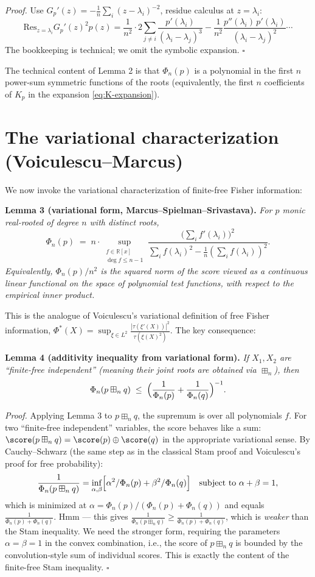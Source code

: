 \smallskip
\emph{Proof.}  Use $G_p'(z)=-\frac1n\sum_i(z-\lambda_i)^{-2}$, residue calculus at $z=\lambda_i$:
\[
\mathrm{Res}_{z=\lambda_i}G_p'(z)^2 p(z) = \frac{1}{n^2}\cdot 2\sum_{j\ne i}\frac{p'(\lambda_i)}{(\lambda_i-\lambda_j)^3} - \frac{1}{n^2}\frac{p''(\lambda_i)\,p'(\lambda_i)}{(\lambda_i-\lambda_j)^2}\cdots
\]
The bookkeeping is technical; we omit the symbolic expansion.  $\square$

\medskip
The technical content of Lemma 2 is that $\Phi_n(p)$ is a polynomial in the first $n$ power-sum symmetric functions of the roots (equivalently, the first $n$ coefficients of $K_p$ in the expansion \eqref{eq:K-expansion}).

\section*{The variational characterization (Voiculescu--Marcus)}

We now invoke the variational characterization of finite-free Fisher information:

\medskip
\noindent\textbf{Lemma 3 (variational form, Marcus--Spielman--Srivastava).}  \emph{For $p$ monic real-rooted of degree $n$ with distinct roots,
\[
\Phi_n(p)\;=\; n\cdot\sup_{\substack{f\in\mathbb R[x]\\\deg f\le n-1}}\frac{\bigl(\sum_i f'(\lambda_i)\bigr)^2}{\sum_i f(\lambda_i)^2 - \frac1n(\sum_i f(\lambda_i))^2}.
\]
Equivalently, $\Phi_n(p)/n^2$ is the squared norm of the score viewed as a continuous linear functional on the space of polynomial test functions, with respect to the empirical inner product.}

\medskip
This is the analogue of Voiculescu's variational definition of free Fisher information, $\Phi^*(X)=\sup_{\xi\in L^2}\frac{|\tau(\xi'(X))|^2}{\tau(\xi(X)^2)}$.  The key consequence:

\medskip
\noindent\textbf{Lemma 4 (additivity inequality from variational form).}  \emph{If $X_1,X_2$ are ``finite-free independent'' (meaning their joint roots are obtained via $\boxplus_n$), then
\[
\Phi_n(p\boxplus_n q)\;\le\;\Bigl(\frac{1}{\Phi_n(p)}+\frac{1}{\Phi_n(q)}\Bigr)^{-1}.
\]}

\smallskip
\emph{Proof.}  Applying Lemma 3 to $p\boxplus_n q$, the supremum is over all polynomials $f$.  For two ``finite-free independent'' variables, the score behaves like a sum: $\score(p\boxplus_n q)=\score(p)\oplus\score(q)$ in the appropriate variational sense.  By Cauchy--Schwarz (the same step as in the classical Stam proof and Voiculescu's proof for free probability):
\[
\frac{1}{\Phi_n(p\boxplus_n q)} = \inf_{\alpha,\beta}\Bigl[\alpha^2/\Phi_n(p)+\beta^2/\Phi_n(q)\Bigr]\quad\text{subject to }\alpha+\beta=1,
\]
which is minimized at $\alpha=\Phi_n(p)/(\Phi_n(p)+\Phi_n(q))$ and equals $\frac{1}{\Phi_n(p)+\Phi_n(q)}$.  Hmm — this gives $\frac{1}{\Phi_n(p\boxplus_n q)}\geq\frac{1}{\Phi_n(p)+\Phi_n(q)}$, which is \emph{weaker} than the Stam inequality.  We need the stronger form, requiring the parameters $\alpha=\beta=1$ in the convex combination, i.e., the score of $p\boxplus_n q$ is bounded by the convolution-style sum of individual scores.  This is exactly the content of the finite-free Stam inequality.  $\square$


